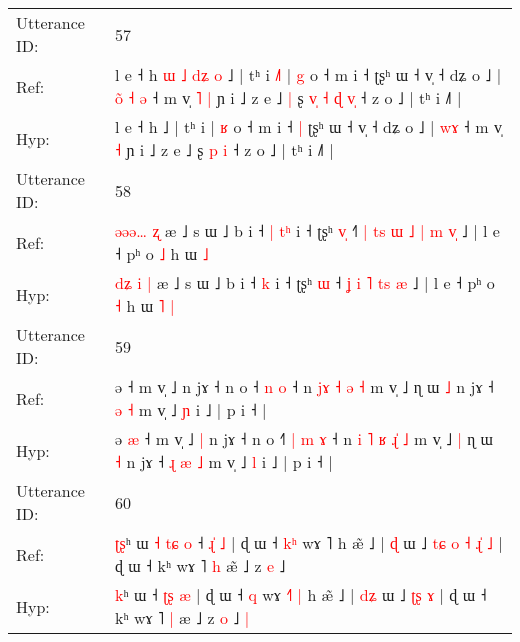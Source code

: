\documentclass[10pt]{article}
\DeclareRobustCommand{\hl}[1]{{\textcolor{red}{#1}}}
\begin{document}
\begin{longtable}{ll}
 \\
\midrule
Utterance ID: & 57 \\
Ref: & l e ˧ h\hl{ }\hl{ɯ}\hl{ }\hl{˩}\hl{ }\hl{d}\hl{ʑ}\hl{ }\hl{o} ˩ | tʰ i\hl{ }\hl{˩}\hl{˥} | \hl{g} o ˧ m i ˧\hl{}\hl{} ʈʂʰ ɯ ˧ v̩ ˧ dʑ o ˩ |\hl{ }\hl{o}\hl{̃} \hl{˧}\hl{ }\hl{ə} ˧ m v̩\hl{ }\hl{˥} \hl{|} ɲ i ˩ z e ˩\hl{ }\hl{|} ʂ\hl{ }\hl{v}\hl{̩}\hl{ }\hl{˧} \hl{ɖ} \hl{v}\hl{̩} ˧ z o ˩ | tʰ i ˩˥ |
 \\
Hyp: & l e ˧ h\hl{}\hl{}\hl{}\hl{}\hl{}\hl{}\hl{}\hl{}\hl{} ˩ | tʰ i\hl{}\hl{}\hl{} | \hl{ʁ} o ˧ m i ˧\hl{ }\hl{|} ʈʂʰ ɯ ˧ v̩ ˧ dʑ o ˩ |\hl{}\hl{}\hl{} \hl{}\hl{w}\hl{ɤ} ˧ m v̩\hl{}\hl{} \hl{˧} ɲ i ˩ z e ˩\hl{}\hl{} ʂ\hl{}\hl{}\hl{}\hl{}\hl{} \hl{p} \hl{}\hl{i} ˧ z o ˩ | tʰ i ˩˥ |
 \\
\midrule
Utterance ID: & 58 \\
Ref: & \hl{ə}\hl{ə}\hl{ə}\hl{…} \hl{ʐ} æ ˩ s ɯ ˩ b i ˧\hl{ }\hl{|} \hl{t}\hl{ʰ} i ˧ ʈʂʰ \hl{v}\hl{̩} ˧\hl{˥}\hl{ }\hl{|} \hl{t}\hl{s} \hl{ɯ} \hl{˩} \hl{|}\hl{ }\hl{m} \hl{v}\hl{̩} ˩ | l e ˧ pʰ o \hl{˩} h ɯ\hl{}\hl{} \hl{˩}
 \\
Hyp: & \hl{d}\hl{ʑ}\hl{ }\hl{i} \hl{|} æ ˩ s ɯ ˩ b i ˧\hl{}\hl{} \hl{}\hl{k} i ˧ ʈʂʰ \hl{}\hl{ɯ} ˧\hl{}\hl{}\hl{} \hl{}\hl{ʝ} \hl{i} \hl{˥} \hl{}\hl{t}\hl{s} \hl{}\hl{æ} ˩ | l e ˧ pʰ o \hl{˧} h ɯ\hl{ }\hl{˥} \hl{|}
 \\
\midrule
Utterance ID: & 59 \\
Ref: & ə\hl{}\hl{} ˧ m v̩ ˩\hl{}\hl{} n jɤ ˧ n o ˧\hl{}\hl{}\hl{} \hl{n} \hl{o} ˧ n \hl{}\hl{j}\hl{ɤ} \hl{˧} \hl{}\hl{ə} \hl{˧} m v̩ ˩\hl{}\hl{} ɳ ɯ \hl{˩} n jɤ ˧\hl{}\hl{} \hl{ə} \hl{˧} m v̩ ˩ \hl{ɲ} i ˩ | p i ˧ |
 \\
Hyp: & ə\hl{ }\hl{æ} ˧ m v̩ ˩\hl{ }\hl{|} n jɤ ˧ n o ˧\hl{˥}\hl{ }\hl{|} \hl{m} \hl{ɤ} ˧ n \hl{i}\hl{ }\hl{˥} \hl{ʁ} \hl{ɻ}\hl{̍} \hl{˩} m v̩ ˩\hl{ }\hl{|} ɳ ɯ \hl{˧} n jɤ ˧\hl{ }\hl{ɻ} \hl{æ} \hl{˩} m v̩ ˩ \hl{l} i ˩ | p i ˧ |
 \\
\midrule
Utterance ID: & 60 \\
Ref: & \hl{ʈ}\hl{ʂ}ʰ ɯ\hl{ }\hl{˧}\hl{ }\hl{t}\hl{ɕ}\hl{ }\hl{o} ˧ \hl{ɻ}\hl{̍} \hl{˩} | ɖ ɯ ˧ \hl{k}\hl{ʰ} wɤ \hl{}˥\hl{}\hl{} h æ̃ ˩ | \hl{}\hl{ɖ} ɯ ˩\hl{ }\hl{t}\hl{ɕ}\hl{ }\hl{o}\hl{ }\hl{˧} \hl{ɻ}\hl{̍} \hl{˩} | ɖ ɯ ˧ kʰ wɤ ˥ \hl{h} æ\hl{̃} ˩ z \hl{e} ˩\hl{}\hl{}
 \\
Hyp: & \hl{}\hl{k}ʰ ɯ\hl{}\hl{}\hl{}\hl{}\hl{}\hl{}\hl{} ˧ \hl{ʈ}\hl{ʂ} \hl{æ} | ɖ ɯ ˧ \hl{}\hl{q} wɤ \hl{˧}˥\hl{ }\hl{|} h æ̃ ˩ | \hl{d}\hl{ʑ} ɯ ˩\hl{}\hl{}\hl{}\hl{}\hl{}\hl{}\hl{} \hl{ʈ}\hl{ʂ} \hl{ɤ} | ɖ ɯ ˧ kʰ wɤ ˥ \hl{|} æ\hl{} ˩ z \hl{o} ˩\hl{ }\hl{|}

\end{longtable}
\end{document}
